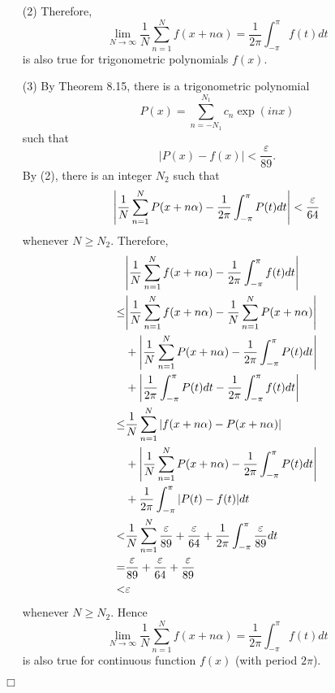 \documentclass{article}
\begin{document}
\begin{enumerate}
\item[(2)]
Therefore,
\[
  \lim_{N \to \infty} \frac{1}{N} \sum_{n=1}^{N} f(x+n\alpha)
  = \frac{1}{2\pi} \int_{-\pi}^{\pi} f(t) dt
\]
is also true for trigonometric polynomials $f(x)$.

\item[(3)]
By Theorem 8.15, there is a trigonometric polynomial
\[
  P(x) = \sum_{n=-N_1}^{N_1} c_n \exp(inx)
\]
such that
\[
  |P(x) - f(x)| < \frac{\varepsilon}{89}.
\]
By (2), there is an integer $N_2$ such that
\[
  \abs{\frac{1}{N} \sum_{n=1}^{N} P(x+n\alpha)
  - \frac{1}{2\pi} \int_{-\pi}^{\pi} P(t) dt} < \frac{\varepsilon}{64}
\]
whenever $N \geq N_2$.
Therefore,
  \begin{align*}
    &\abs{\frac{1}{N} \sum_{n=1}^{N} f(x+n\alpha)
      - \frac{1}{2\pi} \int_{-\pi}^{\pi} f(t) dt} \\
    \leq&
    \abs{\frac{1}{N} \sum_{n=1}^{N} f(x+n\alpha) - \frac{1}{N} \sum_{n=1}^{N} P(x+n\alpha)} \\
      &+ \abs{\frac{1}{N} \sum_{n=1}^{N} P(x+n\alpha) - \frac{1}{2\pi} \int_{-\pi}^{\pi} P(t) dt} \\
      &+ \abs{\frac{1}{2\pi} \int_{-\pi}^{\pi} P(t) dt - \frac{1}{2\pi} \int_{-\pi}^{\pi} f(t) dt} \\
    \leq&
    \frac{1}{N} \sum_{n=1}^{N} \abs{ f(x+n\alpha) - P(x+n\alpha) } \\
      &+ \abs{\frac{1}{N} \sum_{n=1}^{N} P(x+n\alpha) - \frac{1}{2\pi} \int_{-\pi}^{\pi} P(t) dt} \\
      &+ \frac{1}{2\pi} \int_{-\pi}^{\pi} \abs{P(t) - f(t)} dt \\
    <&
    \frac{1}{N} \sum_{n=1}^{N} \frac{\varepsilon}{89}
      + \frac{\varepsilon}{64}
      + \frac{1}{2\pi} \int_{-\pi}^{\pi} \frac{\varepsilon}{89} dt \\
    =&
    \frac{\varepsilon}{89} + \frac{\varepsilon}{64} + \frac{\varepsilon}{89} \\
    <& \varepsilon
  \end{align*}
whenever $N \geq N_2$.
Hence
\[
  \lim_{N \to \infty} \frac{1}{N} \sum_{n=1}^{N} f(x+n\alpha)
  = \frac{1}{2\pi} \int_{-\pi}^{\pi} f(t) dt
\]
is also true for continuous function $f(x)$ (with period $2\pi$).
\end{enumerate}
$\Box$ \\\\



\end{document}
